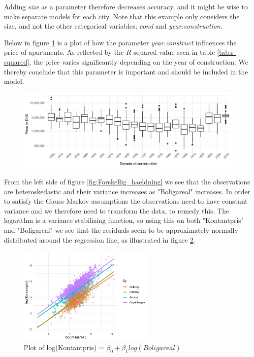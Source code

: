 Adding \textit{size} as a parameter therefore decreases accuracy, and it might be wise to make separate models for each city. 
Note that this example only considers the size, and not the other categorical variables; \textit{cond} and \textit{year.construction}.

Below in figure \ref{fig:Opfoerelsesaar_plot} is a plot of how the parameter \textit{year.construct} influences the price of apartments.
As reflected by the $R$-squared value seen in table \ref{tab:r-squared}, the price varies significantly depending on the year of construction. 
We thereby conclude that this parameter is important and should be included in the model. 

\begin{figure}[H]
    \centering
    \includegraphics[width = 1\textwidth]{figures/Nanna/Opfoerelsesaarplot.pdf}
    \caption{}
    \label{fig:Opfoerelsesaar_plot}
\end{figure}

From the left side of figure \ref{fig:Forskellig_haeldning} we see that the observations are heteroskedastic and their variance increases as "Boligareal" increases. 
In order to satisfy the Gauss-Markov assumptions the observations need to have constant variance and we therefore need to transform the data, to remedy this. 
The logarithm is a variance stabilizing function, so using this on both "Kontantpris" and "Boligareal" we see that the residuals seem to be approximately normally distributed around the regression line, as illustrated in figure \ref{fig:Log_Model_plot}. 

\begin{figure}[H] 
    \centering
    \includegraphics[width = 0.6\textwidth]{figures/Nanna/Plot_forskellig_haeldning.pdf}
    \caption{Plot of log(Kontantpris) = $\beta_0 + \beta_1 log(Boligareal)$ }
    \label{fig:Log_Model_plot}
\end{figure}

